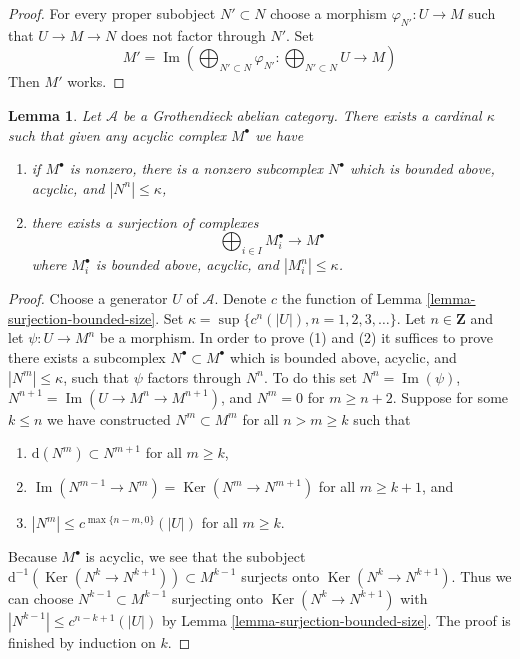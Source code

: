 \documentclass{amsart}
\theoremstyle{plain}
\newtheorem{lemma}[subsection]{Lemma}
\theoremstyle{definition}
\theoremstyle{remark}
\numberwithin{equation}{subsection}
\def\Ker{\mathop{\mathrm{Ker}}}
\def\Im{\mathop{\mathrm{Im}}}
\begin{document}
\begin{proof}
For every proper subobject $N' \subset N$ choose a morphism
$\varphi_{N'} : U \to M$ such that $U \to M \to N$ does not factor
through $N'$. Set
$$
M' = \Im\left(
\bigoplus\nolimits_{N' \subset N} \varphi_{N'} :
\bigoplus\nolimits_{N' \subset N} U \longrightarrow M\right)
$$
Then $M'$ works.
\end{proof}


\begin{lemma}
\label{lemma-acyclic-quotient-complexes-bounded-size}
Let $\mathcal{A}$ be a Grothendieck abelian category. There exists a cardinal
$\kappa$ such that given any acyclic complex $M^\bullet$ we have
\begin{enumerate}
\item if $M^\bullet$ is nonzero, there is a nonzero subcomplex
$N^\bullet$ which is bounded above, acyclic, and $|N^n| \leq \kappa$,
\item there exists a surjection of complexes
$$
\bigoplus\nolimits_{i \in I} M_i^\bullet \longrightarrow M^\bullet
$$
where $M_i^\bullet$ is bounded above, acyclic, and $|M_i^n| \leq \kappa$.
\end{enumerate}
\end{lemma}

\begin{proof}
Choose a generator $U$ of $\mathcal{A}$. Denote $c$ the function of
Lemma \ref{lemma-surjection-bounded-size}.
Set $\kappa = \sup \{c^n(|U|), n = 1, 2, 3, \ldots\}$.
Let $n \in \mathbf{Z}$ and let $\psi : U \to M^n$ be a morphism.
In order to prove (1) and (2) it suffices to prove there exists a subcomplex
$N^\bullet \subset M^\bullet$ which is bounded above, acyclic, and
$|N^m| \leq \kappa$, such that $\psi$ factors through $N^n$.
To do this set $N^n = \Im(\psi)$, $N^{n + 1} = \Im(U \to M^n \to M^{n + 1})$,
and $N^m = 0$ for $m \geq n + 2$.
Suppose for some $k \leq n$ we have constructed $N^m \subset M^m$
for all $n > m \geq k$ such that
\begin{enumerate}
\item $\text{d}(N^m) \subset N^{m + 1}$ for all $m \geq k$,
\item $\Im(N^{m - 1} \to N^m) = \Ker(N^m \to N^{m + 1})$ for
all $m \geq k + 1$, and
\item $|N^m| \leq c^{\max\{n - m, 0\}}(|U|)$ for all $m \geq k$.
\end{enumerate}
Because $M^\bullet$ is acyclic, we see that the subobject
$\text{d}^{-1}(\Ker(N^k \to N^{k + 1})) \subset M^{k - 1}$ surjects onto
$\Ker(N^k \to N^{k + 1})$. Thus we can choose $N^{k - 1} \subset M^{k - 1}$
surjecting onto $\Ker(N^k \to N^{k + 1})$ with
$|N^{k - 1}| \leq c^{n - k + 1}(|U|)$ by
Lemma \ref{lemma-surjection-bounded-size}. The proof is finished by
induction on $k$.
\end{proof}
\end{document}
